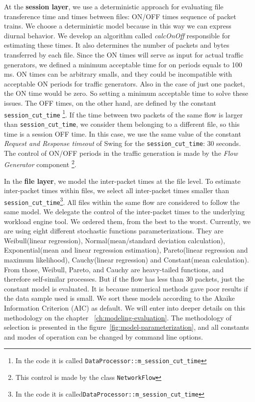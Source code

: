 At the \textbf{session layer}, we use a deterministic approach for evaluating file transference time and times between files: ON/OFF times sequence of packet trains. We choose a deterministic model because in this way we can express diurnal behavior\cite{harpoon-paper}.  We develop an algorithm called \textit{calcOnOff} responsible for estimating these times. It also determines the number of packets and bytes transferred by each file. Since the ON times will serve as input for actual traffic generators, we defined a minimum acceptable time for on periods equals to 100 ms. ON times can be arbitrary smalls, and they could be incompatible with acceptable ON periods for traffic generators. Also in the case of just one packet, the ON time would be zero. So setting a minimum acceptable time to solve these issues. The OFF times, on the other hand, are defined by the constant \texttt{session\_cut\_time} \footnote{In the code it is called \texttt{DataProcessor::m\_session\_cut\_time} }. If the time between two packets of the same flow is larger than \texttt{session\_cut\_time}, we consider them belonging to a different file, so this time is a session OFF time. In this case, we use the same value of the constant \textit{Request and Response timeout} of Swing\cite{swing-paper} for the \texttt{session\_cut\_time}: 30 seconds. The control of ON/OFF periods in the traffic generation is made by the \textit{Flow Generator} component \footnote{This control is made by the class \texttt{NetworkFlow}}.


In the \textbf{file layer}, we model the inter-packet times at the file level. To estimate inter-packet times within files, we select all inter-packet times smaller than \texttt{session\_cut\_time}\footnote{In the code it is called\texttt{DataProcessor::m\_session\_cut\_time} }. All files within the same flow are considered to follow the same model. We delegate the control of the inter-packet times to the underlying workload engine tool. We ordered them, from the best to the worst. Currently, we are using eight different stochastic functions parameterizations. They are Weibull(linear regression), Normal(mean/standard deviation calculation), Exponential(mean and linear regression estimation), Pareto(linear regression and maximum likelihood), Cauchy(linear regression) and Constant(mean calculation). From those, Weibull, Pareto, and Cauchy are heavy-tailed functions, and therefore self-similar processes. But if the flow has less than 30 packets, just the constant model is evaluated. It is because numerical methods gave poor results if the data sample used is small. We sort these models according to the Akaike Information Criterion (AIC) as default\cite{sourcesonoff-paper}\cite{bic-aic-comparision}. We will enter into deeper details on this methodology on the chapter ~\ref{ch:modeling-evaluation}. The methodology of selection is presented in the figure~\ref{fig:model-parameterization}, and all constants and modes of operation can be changed by command line options.


